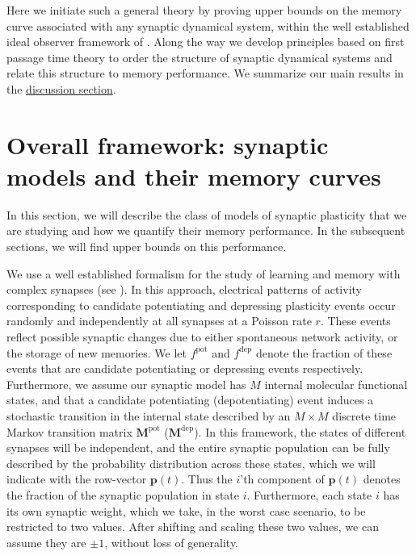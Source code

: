 \documentclass{article} %
\newcommand{\pr}{\mathbf{p}}
\newcommand{\M}{\mathbf{M}}
\newcommand{\pot}{^{\text{pot}}}
\newcommand{\dep}{^{\text{dep}}}
\begin{document}
Here we initiate such a general theory by proving upper bounds on the memory curve associated with any synaptic dynamical system, within the well established ideal
observer framework of \cite{Fusi2005cascade,Fusi2007multistate,Barrett2008discrete}.
Along the way we develop principles based on first passage time theory to order the structure of synaptic dynamical systems and relate this structure to memory performance.
We summarize our main results in the \hyperref[sec:disc]{discussion section}.





\section{Overall framework: synaptic models and their memory curves}\label{sec:setup}

In this section, we will describe the class of models of synaptic plasticity that we are studying and how we quantify their memory performance.
In the subsequent sections, we will find upper bounds on this performance.

We use a well established formalism for the study of learning and memory with complex synapses (see \cite{Fusi2005cascade,Fusi2007multistate,Barrett2008discrete}).
In this approach, electrical patterns of activity corresponding to candidate potentiating and depressing plasticity events occur randomly and independently at all synapses at a Poisson rate $r$.  These events reflect possible synaptic changes due to either spontaneous network activity, or the storage of new memories.
We let  $f\pot$ and  $f\dep$ denote the fraction of these events that are candidate potentiating or depressing events respectively.
Furthermore, we assume our synaptic model has $M$ internal molecular functional states, and that a candidate potentiating (depotentiating) event induces a stochastic transition in the internal state described by an $M \times M$ discrete time Markov transition matrix  $\M\pot$ ($\M\dep$).
In this framework, the states of different synapses will be independent, and the entire synaptic population can be fully described by the probability distribution across these states, which we will indicate with the row-vector $\pr(t)$.
Thus the $i$'th component of $\pr(t)$ denotes the fraction of the synaptic population in state $i$.
Furthermore, each state $i$ has its own synaptic weight, which we take, in the worst case scenario, to be restricted to two values.
After shifting and scaling these two values,  we can assume they are $\pm1$, without loss of generality.
\end{document}
